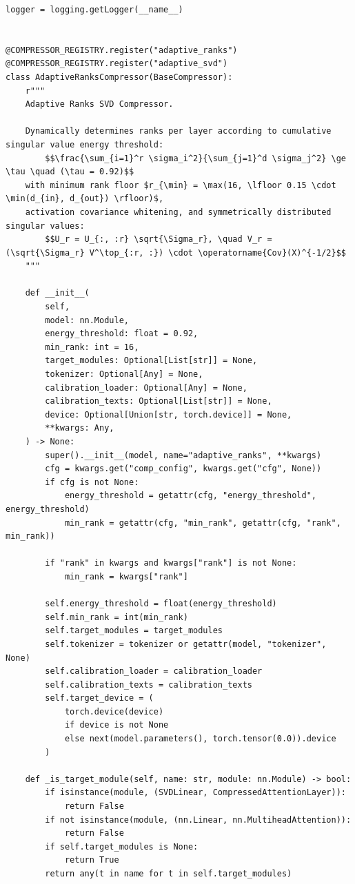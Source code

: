 \begin{lstlisting}
logger = logging.getLogger(__name__)


@COMPRESSOR_REGISTRY.register("adaptive_ranks")
@COMPRESSOR_REGISTRY.register("adaptive_svd")
class AdaptiveRanksCompressor(BaseCompressor):
    r"""
    Adaptive Ranks SVD Compressor.

    Dynamically determines ranks per layer according to cumulative singular value energy threshold:
        $$\frac{\sum_{i=1}^r \sigma_i^2}{\sum_{j=1}^d \sigma_j^2} \ge \tau \quad (\tau = 0.92)$$
    with minimum rank floor $r_{\min} = \max(16, \lfloor 0.15 \cdot \min(d_{in}, d_{out}) \rfloor)$,
    activation covariance whitening, and symmetrically distributed singular values:
        $$U_r = U_{:, :r} \sqrt{\Sigma_r}, \quad V_r = (\sqrt{\Sigma_r} V^\top_{:r, :}) \cdot \operatorname{Cov}(X)^{-1/2}$$
    """

    def __init__(
        self,
        model: nn.Module,
        energy_threshold: float = 0.92,
        min_rank: int = 16,
        target_modules: Optional[List[str]] = None,
        tokenizer: Optional[Any] = None,
        calibration_loader: Optional[Any] = None,
        calibration_texts: Optional[List[str]] = None,
        device: Optional[Union[str, torch.device]] = None,
        **kwargs: Any,
    ) -> None:
        super().__init__(model, name="adaptive_ranks", **kwargs)
        cfg = kwargs.get("comp_config", kwargs.get("cfg", None))
        if cfg is not None:
            energy_threshold = getattr(cfg, "energy_threshold", energy_threshold)
            min_rank = getattr(cfg, "min_rank", getattr(cfg, "rank", min_rank))

        if "rank" in kwargs and kwargs["rank"] is not None:
            min_rank = kwargs["rank"]

        self.energy_threshold = float(energy_threshold)
        self.min_rank = int(min_rank)
        self.target_modules = target_modules
        self.tokenizer = tokenizer or getattr(model, "tokenizer", None)
        self.calibration_loader = calibration_loader
        self.calibration_texts = calibration_texts
        self.target_device = (
            torch.device(device)
            if device is not None
            else next(model.parameters(), torch.tensor(0.0)).device
        )

    def _is_target_module(self, name: str, module: nn.Module) -> bool:
        if isinstance(module, (SVDLinear, CompressedAttentionLayer)):
            return False
        if not isinstance(module, (nn.Linear, nn.MultiheadAttention)):
            return False
        if self.target_modules is None:
            return True
        return any(t in name for t in self.target_modules)


\end{lstlisting}

